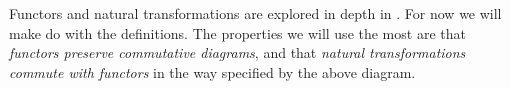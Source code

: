
Functors and natural transformations are explored in depth in \cite{Leinster}. For now we will make do with the definitions. The properties we will use the most are that \textit{functors preserve commutative diagrams}, and that \textit{natural transformations commute with functors} in the way specified by the above diagram. 